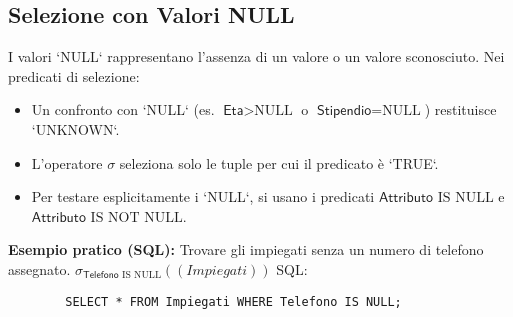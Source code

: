 \documentclass{article}
\newcommand{\Rel}[1]{\textit{#1}} %
\newcommand{\Attr}[1]{\textsf{#1}} %
\newcommand{\myselectop}[2]{\sigma_{#1}(#2)}
\begin{document}
	\subsection{Selezione con Valori NULL}
	I valori `NULL` rappresentano l'assenza di un valore o un valore sconosciuto.
	Nei predicati di selezione:
	\begin{itemize}
		\item Un confronto con `NULL` (es. $\Attr{Eta} > \text{NULL}$ o $\Attr{Stipendio} = \text{NULL}$) restituisce `UNKNOWN`.
		\item L'operatore $\sigma$ seleziona solo le tuple per cui il predicato è `TRUE`.
		\item Per testare esplicitamente i `NULL`, si usano i predicati $\Attr{Attributo} \text{ IS NULL}$ e $\Attr{Attributo} \text{ IS NOT NULL}$.
	\end{itemize}
	\textbf{Esempio pratico (SQL):} Trovare gli impiegati senza un numero di telefono assegnato.
	$\myselectop{\Attr{Telefono} \text{ IS NULL}}{(\Rel{Impiegati})}$
	SQL:
	\begin{verbatim}
		SELECT * FROM Impiegati WHERE Telefono IS NULL;
	\end{verbatim}
	
\end{document}

